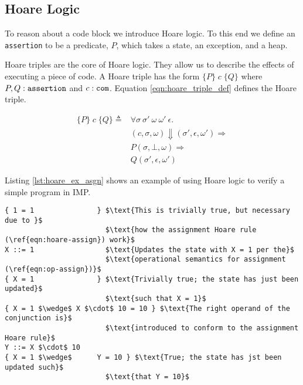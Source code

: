 
\subsection{Hoare Logic}
To reason about a code block we introduce Hoare logic. To this end we define an \verb|assertion| to be a predicate, $P$, which takes a state, an exception, and a heap.

Hoare triples are the core of Hoare logic. They allow us to describe the effects of executing a piece of code. A Hoare triple has the form $\{P\}\;c\;\{Q\}$ where $P,Q : \verb|assertion|$ and $c : \verb|com|$.
Equation \ref{eqn:hoare_triple_def} defines the Hoare triple.

\begin{equation}\label{eqn:hoare_triple_def}
\begin{alignedat}{1}
\{P\}\;c\;\{Q\} \triangleq &\forall \sigma \: \sigma' \: \omega \: \omega' \: \epsilon .\\
& (c,\sigma,\omega) \Downarrow (\sigma', \epsilon, \omega') \Rightarrow\\
& P(\sigma,\bot,\omega) \Rightarrow\\
& Q(\sigma',\epsilon,\omega')
\end{alignedat}
\end{equation}

Listing \ref{lst:hoare_ex_asgn} shows an example of using Hoare logic to verify a simple program in IMP.

\begin{lstlisting}[mathescape=true,keepspaces=true,label=lst:hoare_ex_asgn,caption=A simple code block proven using Hoare triples.]
{ 1 = 1               } $\text{This is trivially true, but necessary due to }$
                        $\text{how the assignment Hoare rule (\ref{eqn:hoare-assign}) work}$
X ::= 1                 $\text{Updates the state with X = 1 per the}$
                        $\text{operational semantics for assignment (\ref{eqn:op-assign})}$
{ X = 1               } $\text{Trivially true; the state has just been updated}$
                        $\text{such that X = 1}$
{ X = 1 $\wedge$ X $\cdot$ 10 = 10 } $\text{The right operand of the conjunction is}$
                        $\text{introduced to conform to the assignment Hoare rule}$
Y ::= X $\cdot$ 10
{ X = 1 $\wedge$      Y = 10 } $\text{True; the state has jst been updated such}$
                        $\text{that Y = 10}$
\end{lstlisting}

